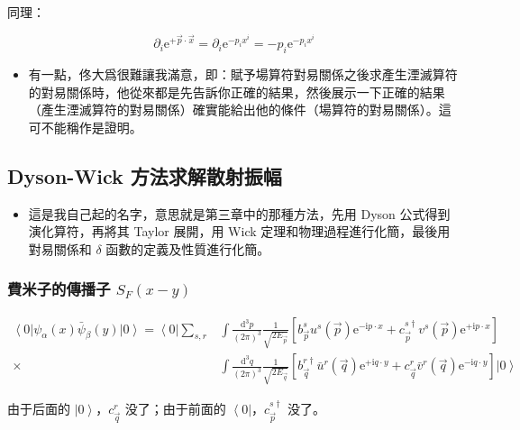 \documentclass{article}
\begin{document}
同理：

$$
  \partial_i\mathrm{e}^{+\vec{p}\cdot\vec{x}}=\partial_i\mathrm{e}^{-p_ix^i}=-p_i\mathrm{e}^{-p_ix^i}
$$

\begin{itemize}
  \item 有一點，佟大爲很難讓我滿意，即：賦予場算符對易關係之後求產生湮滅算符的對易關係時，他從來都是先告訴你正確的結果，然後展示一下正確的結果（產生湮滅算符的對易關係）確實能給出他的條件（場算符的對易關係）。這可不能稱作是證明。
\end{itemize}

\subsection{Dyson-Wick 方法求解散射振幅}

\begin{itemize}
  \item 這是我自己起的名字，意思就是第三章中的那種方法，先用 Dyson 公式得到演化算符，再將其 Taylor 展開，用 Wick 定理和物理過程進行化簡，最後用對易關係和 $\delta$ 函數的定義及性質進行化簡。
\end{itemize}

\subsubsection{費米子的傳播子 $S_F(x-y)$}

$$
  \begin{aligned}
    \left\langle0\right|\psi_{\alpha}(x)\bar{\psi}_{\beta}(y)\left|0\right\rangle=\left\langle0\right|\sum_{s,r} & \int\frac{\mathrm{d}^3p}{(2\pi)^3}\frac{1}{\sqrt{2E_{\vec{p}}}}\left[b_{\vec{p}}^su^s(\vec{p})\mathrm{e}^{-\mathrm{i}p\cdot x}+c_{\vec{p}}^{s\dagger}v^s(\vec{p})\mathrm{e}^{+\mathrm{i}p\cdot x}\right]                                   \\
    \times                                                                                                       & \int\frac{\mathrm{d}^3q}{(2\pi)^3}\frac{1}{\sqrt{2E_{\vec{q}}}}\left[b_{\vec{q}}^{r\dagger}\bar{u}^r(\vec{q})\mathrm{e}^{+\mathrm{i}q\cdot y}+c_{\vec{q}}^{r}\bar{v}^r(\vec{q})\mathrm{e}^{-\mathrm{i}q\cdot y}\right]\left|0\right\rangle
  \end{aligned}
$$

由于后面的 $\left|0\right\rangle$，$c_{\vec{q}}^r$ 没了；由于前面的 $\left\langle0\right|$，$c_{\vec{p}}^{s\dagger}$ 没了。
\end{document}
